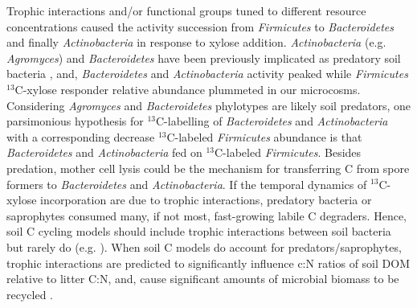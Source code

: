 Trophic interactions and/or functional groups tuned to different resource
concentrations caused the activity succession from \textit{Firmicutes} to
\textit{Bacteroidetes} and finally \textit{Actinobacteria} in response to
xylose addition. \textit{Actinobacteria} (e.g. \textit{Agromyces}) and
\textit{Bacteroidetes} have been previously implicated as predatory soil
bacteria \citep{Lueders2006,16346402}, and, \textit{Bacteroidetes} and
\textit{Actinobacteria} activity peaked while \textit{Firmicutes}
$^{13}$C-xylose responder relative abundance plummeted in our microcosms.
Considering \textit{Agromyces} and \textit{Bacteroidetes} phylotypes are likely
soil predators, one parsimonious hypothesis for $^{13}$C-labelling of
\textit{Bacteroidetes} and \textit{Actinobacteria} with a corresponding
decrease $^{13}$C-labeled \textit{Firmicutes} abundance is that
\textit{Bacteroidetes} and \textit{Actinobacteria} fed on $^{13}$C-labeled
\textit{Firmicutes}. Besides predation, mother cell lysis could be the
mechanism for transferring C from spore formers to \textit{Bacteroidetes} and
\textit{Actinobacteria}. If the temporal dynamics of $^{13}$C-xylose
incorporation are due to trophic interactions, predatory bacteria or
saprophytes consumed many, if not most, fast-growing labile C degraders.
Hence, soil C cycling models should include trophic interactions between soil
bacteria but rarely do (e.g. \citep{Moore1988}). When soil C models do account
for predators/saprophytes, trophic interactions are predicted to significantly
influence c:N ratios of soil DOM relative to litter C:N, and, cause significant
amounts of microbial biomass to be recycled \citep{Kaiser2014a}.

